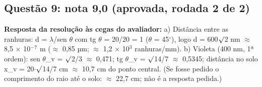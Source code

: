 \documentclass{article}%
\begin{document}
\subsection*{Questão 9: nota 9,0 (aprovada, rodada 2 de 2)}%
\textbf{Resposta da resolução às cegas do avaliador:} a) Distância entre as ranhuras: d = $\lambda$/sen $\theta$ com tg $\theta$ = 20/20 = 1 ($\theta$ = 45$^\circ$), logo d = 600$\surd$2 nm $\approx$ 8,5 $\times$ 10$^{-}$$^{7}$ m ($\approx$ 0,85 µm; $\approx$ 1,2 $\times$ 10$^3$ ranhuras/mm).\newline%
\newline%
b) Violeta (400 nm, 1ª ordem): sen $\theta$\_v = $\surd$2/3 $\approx$ 0,471; tg $\theta$\_v = $\surd$14/7 $\approx$ 0,5345; distância no solo x\_v = 20$\cdot$$\surd$14/7 cm $\approx$ 10,7 cm do ponto central. (Se fosse pedido o comprimento do raio até o solo: $\approx$ 22,7 cm; não é a resposta pedida.)\par %
\end{document}
